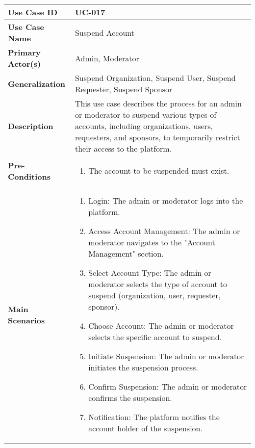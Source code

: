 \begin{table}[!ht]
    \centering
    \renewcommand{\arraystretch}{1.3} %
    \begin{tabularx}{\textwidth}{|l|X|}
        \hline
        \textbf{Use Case ID} & UC-017 \\
        \hline
        \textbf{Use Case Name} & Suspend Account \\
        \hline
        \textbf{Primary Actor(s)} & Admin, Moderator \\
        \hline
        \textbf{Generalization} & Suspend Organization, Suspend User, Suspend Requester, Suspend Sponsor \\
        \hline
        \textbf{Description} & This use case describes the process for an admin or moderator to suspend various types of accounts, including organizations, users, requesters, and sponsors, to temporarily restrict their access to the platform. \\
        \hline
        \textbf{Pre-Conditions} & 
        \begin{enumerate}[label=\arabic*.,itemsep=0pt]
            \item The account to be suspended must exist.
        \end{enumerate} \\
        \hline
        \textbf{Main Scenarios} & 
        \begin{enumerate}[label=\arabic*.,itemsep=0pt]
            \item Login: The admin or moderator logs into the platform.
            \item Access Account Management: The admin or moderator navigates to the "Account Management" section.
            \item Select Account Type: The admin or moderator selects the type of account to suspend (organization, user, requester, sponsor).
            \item Choose Account: The admin or moderator selects the specific account to suspend.
            \item Initiate Suspension: The admin or moderator initiates the suspension process.
            \item Confirm Suspension: The admin or moderator confirms the suspension.
            \item Notification: The platform notifies the account holder of the suspension.
        \end{enumerate} \\
        \hline

\end{tabularx}
\end{table}
